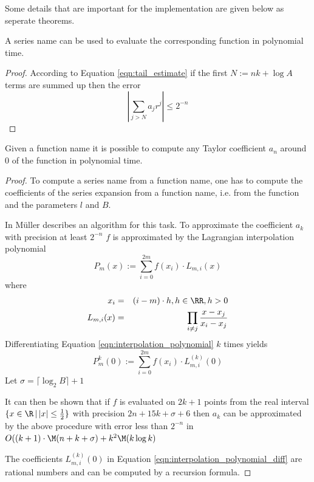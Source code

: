    Some details that are important for the implementation are given below as seperate theorems.

   \begin{theorem}
     A series name can be used to evaluate the corresponding function in polynomial time.
     \begin{proof}
       According to Equation \ref{eqn:tail_estimate} if the first $N := nk+\log A$ terms are summed up then the error 
       $$ \left | \sum_{j > N} a_j r^j \right | \leq 2^{-n} $$
     \end{proof}
   \end{theorem}

   \begin{theorem}
    Given a function name it is possible to compute any Taylor coefficient $a_n$ around $0$ of the function
    in polynomial time.
    
	 \begin{proof}
	 	To compute a series name from a function name, one has to compute the coefficients of the series 
    expansion from a function name, i.e. from the function and the parameters $l$ and $B$.

	 	In \cite{Muller1993} M\"uller describes an algorithm for this task.
	 	To approximate the coefficient $a_k$ with precision at least $2^{-n}$ $f$ is approximated by the Lagrangian interpolation
	 	polynomial
	 	\begin{equation}\label{eqn:interpolation_polynomial}
	 		P_m(x)  :=  \sum_{i=0}^{2m} f(x_i) \cdot L_{m,i}(x) 
	 	\end{equation}
	 	where
	 	\begin{eqnarray*}
	 		x_i & = & (i-m) \cdot h , h \in \RR, h > 0 \\
	 		L_{m,i}(x) & = & \prod_{i \neq j} \frac{x-x_j}{x_i-x_j} 
	 	\end{eqnarray*}
	 	Differentiating Equation \ref{eqn:interpolation_polynomial} $k$ times yields
	 	\begin{equation}\label{eqn:interpolation_polynomial_diff}
	 		P_m^k(0)  :=  \sum_{i=0}^{2m} f(x_i) \cdot L_{m,i}^{(k)}(0) 
	 	\end{equation}
	 	Let $\sigma = \lceil \log_2 B \rceil + 1$

	 	It can then be shown that if $f$ is evaluated on $2k+1$ points from the 
	 	real interval $\{x \in \R \,|\, |x| \leq \frac{1}{2}\}$ with precision $2n+15k+\sigma+6$ 
	 	then $a_k$ can be approximated by the above procedure with error less than $2^{-n}$ in 
	 	$O((k+1)\cdot \M(n+k+\sigma) + k^2 \M (k \log k)$

    The coefficients $L_{m,i}^{(k)}(0) $ in Equation \ref{eqn:interpolation_polynomial_diff} 
    are rational numbers and can be computed by a recursion formula.
	 \end{proof}
   \end{theorem}

